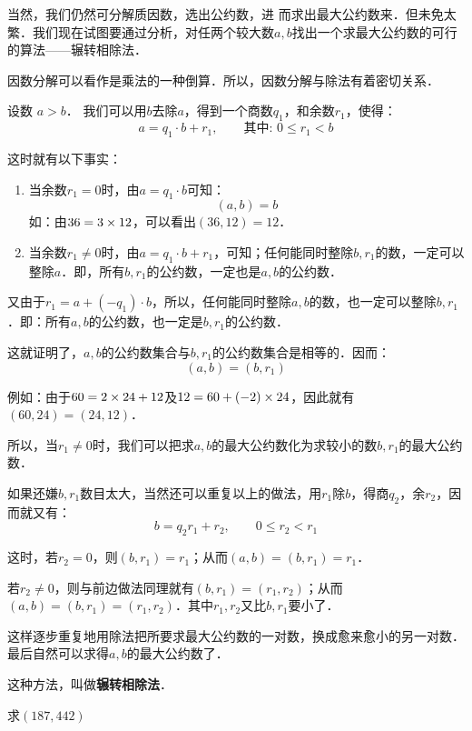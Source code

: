 当然，我们仍然可分解质因数，选出公约数，进
而求出最大公约数来．但未免太繁．我们现在试图要通过分析，对任两个较大数$a,b$找出一个求最大公约数的可行的算法——辗转相除法．

\begin{analyze}
 因数分解可以看作是乘法的一种倒算．所以，因数分解与除法有着密切关系．

设数 $a>b$． 我们可以用$b$去除$a$，得到一个商数$q_1$，和余数$r_1$，使得：
$$a=q_1\cdot b+r_1,\qquad \text{其中: }0\le r_1<b$$

这时就有以下事实：
\begin{enumerate}
    \item 当余数$r_1=0$时，由$a=q_1\cdot b$可知：
    \[(a,b) =b\]
    如：由$36=3\times12$，可以看出$(36, 12)=12$．

\item 当余数$r_1\ne 0$时，由$a=q_1\cdot b+r_1$，可知；任何能同时整除$b,r_1$的数，一定可以整除$a$．即，所有$b,r_1$的公约数，一定也是$a,b$的公约数．
\end{enumerate}

又由于$r_1=a+(-q_1)\cdot b$，所以，任何能同时整除$a,b$的数，也一定可以整除$b,r_1$．即：所有$a,b$的公约数，也一定是$b,r_1$的公约数．

这就证明了，$a,b$的公约数集合与$b,r_1$的公约数集合是相等的．因而：   
\[(a,b)=(b,r_1)  \]

例如：由于$60=2\times 24+12$及$12=60+(-2)\times 24$，因此就有$(60,24)=(24,12)$．

所以，当$r_1\ne 0$时，我们可以把求$a,b$的最大公约数化为求较小的数$b,r_1$的最大公约数．

如果还嫌$b,r_1$数目太大，当然还可以重复以上的做法，用$r_1$除$b$，得商$q_2$，余$r_2$，因而就又有：
\[b=q_2r_1 +r_2,\qquad  0\le r_2<r_1\]

这时，若$r_2=0$，则$(b,r_1)=r_1$；从而$(a,b)= (b,r_1) =r_1$．

若$r_2\ne 0$，则与前边做法同理就有$(b,r_1)=(r_1, r_2)$；从而$(a,b)=(b,r_1)=(r_1,r_2)$．其中$r_1,r_2$又比$b,r_1$要小了．

这样逐步重复地用除法把所要求最大公约数的一对数，换成愈来愈小的另一对数．最后自然可以求得$a,b$的最大公约数了．

这种方法，叫做\textbf{辗转相除法}．
\end{analyze}


\begin{example}
求$(187, 442)$    
\end{example}

